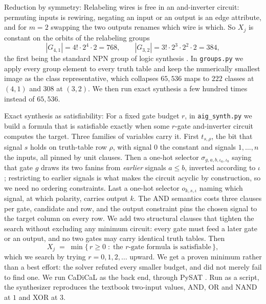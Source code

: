 \documentclass[11pt]{article}
\begin{document}
Reduction by symmetry: Relabeling wires is free in an
and-inverter circuit: permuting inputs is rewiring, negating an input
or an output is an edge attribute, and for $m = 2$ swapping the two
outputs renames which wire is which. So $X_j$ is constant on the orbits
of the relabeling groups
%
\begin{equation}
  |G_{4,1}| = 4!\cdot 2^4\cdot 2 = 768,
  \qquad
  |G_{3,2}| = 3!\cdot 2^3\cdot 2^2\cdot 2 = 384,
\end{equation}
%
the first being the standard NPN group of logic synthesis \cite{knuth4a}.
In \texttt{groups.py} we apply every group element to every truth table
and keep the numerically smallest image as the class representative,
which collapses $65{,}536$ maps to $222$ classes at $(4,1)$ and $308$ at
$(3,2)$. We then run exact synthesis a few hundred times instead of
$65{,}536$.

Exact synthesis as satisfiability: For a fixed gate budget $r$, in
\texttt{aig\_synth.py} we build a formula that is satisfiable exactly when
some $r$-gate and-inverter circuit computes the target. Three families
of variables carry it. First $t_{s,\rho}$, the bit that signal $s$
holds on truth-table row $\rho$, with signal $0$ the constant and
signals $1,\ldots,n$ the inputs, all pinned by unit clauses. Then a
one-hot selector $\sigma_{g,a,b,\iota_a,\iota_b}$ saying that gate $g$
draws its two fanins from \emph{earlier} signals $a \le b$, inverted
according to $\iota$; restricting to earlier signals is what makes the
circuit acyclic by construction, so we need no ordering constraints.
Last a one-hot selector $o_{k,s,\iota}$ naming which signal, at which
polarity, carries output $k$. The AND semantics costs three clauses per
gate, candidate and row, and the output constraint pins the chosen
signal to the target column on every row. We add two structural clauses
that tighten the search without excluding any minimum circuit: every
gate must feed a later gate or an output, and no two gates may carry
identical truth tables. Then
%
\begin{equation}
  X_j \;=\; \min\{\, r \ge 0 \;:\; \text{the $r$-gate formula is
  satisfiable} \,\},
  \label{eq:aigmin}
\end{equation}
%
which we search by trying $r = 0, 1, 2, \ldots$ upward. We get a proven
minimum rather than a best effort: the solver refuted every smaller
budget, and did not merely fail to find one. We run CaDiCaL \cite{cadical}
as the back end, through PySAT \cite{pysat}. Run as a script, the synthesizer
reproduces the textbook two-input values, AND, OR and NAND at $1$ and
XOR at $3$.
\end{document}
